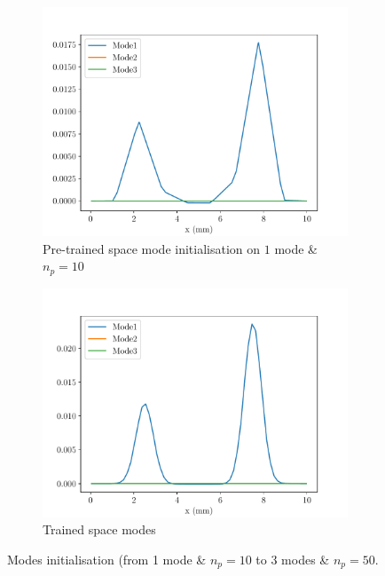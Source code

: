 \begin{figure}
    \begin{subfigure}[t]{0.5\linewidth}
        \centering
        \includegraphics[width=\linewidth]{Figures/Pre_trained_Space_modes3.pdf}
        \caption{Pre-trained space mode initialisation on $1$ mode \& $n_p=10$}
    \end{subfigure}
    \begin{subfigure}[t]{0.5\linewidth}
        \centering
        \includegraphics[width=\linewidth]{Figures/Trained_Space_modes3.pdf}
        \caption{Trained space modes}
    \end{subfigure}
    \caption{Modes initialisation (from 1 mode \& $n_p=10$ to $3$ modes \& $n_p=50$.}
    \label{fig:InitialisationModes}
\end{figure}




